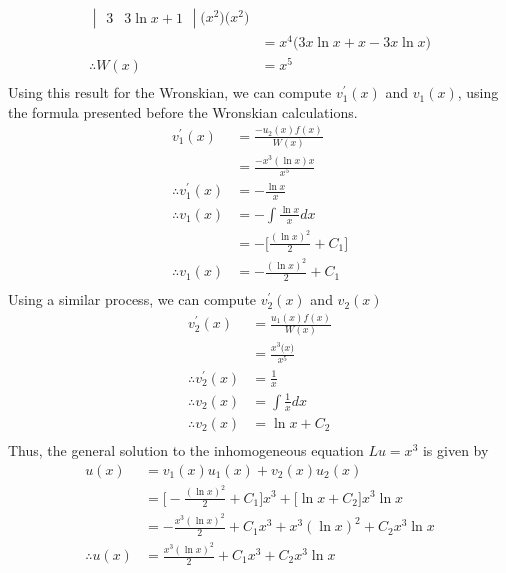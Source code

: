 \documentclass[a4paper]{article}
\newcommand{\ds}{\displaystyle}
\begin{document}
\begin{enumerate}
\begin{align*}
\begin{vmatrix}
			3 & 3\ln x + 1
		\end{vmatrix}\big(x^2\big)\big(x^2\big)\\
		& = x^4 \big(3x\ln x + x - 3x\ln x \big)\\
		\therefore W(x) & = x^5\\
	\end{align*}
	Using this result for the Wronskian, we can compute $\ds{v_1^{\prime}(x)}$ and $\ds{v_1(x)}$, using the formula presented before the Wronskian calculations.
	\begin{align*}
		v_1^{\prime}(x) & = \frac{-u_2(x)f(x)}{W(x)}\\
		& = \frac{-x^3(\ln x)x}{x^5}\\
		\therefore v_1^{\prime}(x) & = -\frac{\ln x}{x}\\
		\therefore v_1(x) & = - \int \frac{\ln x}{x} dx\\
		& = -\bigg[\frac{(\ln x)^2}{2} + C_1 \bigg]\\
		\therefore v_1(x) & = -\frac{(\ln x)^2}{2} + C_1\\
	\end{align*}
	Using a similar process, we can compute $\ds{v_2^{\prime}(x)}$ and $\ds{v_2(x)}$
	\begin{align*}
		v_2^{\prime}(x) & = \frac{u_1(x)f(x)}{W(x)}\\
		& = \frac{x^3\big(x\big)}{x^5}\\
		\therefore v_2^{\prime}(x) & = \frac{1}{x}\\
		\therefore v_2(x) & = \int \frac{1}{x} dx\\
		\therefore v_2(x) & = \ln{x} + C_2\\
	\end{align*}
	Thus, the general solution to the inhomogeneous equation $\ds{Lu = x^3}$ is given by
	\begin{align*}
		u(x) & = v_1(x)u_1(x) + v_2(x)u_2(x)\\
		& = \bigg[-\frac{(\ln x)^2}{2} + C_1\bigg]x^3 + \bigg[\ln{x} + C_2\bigg]x^3\ln x\\
		& = -\frac{x^3(\ln x)^2}{2} + C_1x^3 + x^3(\ln{x})^2 + C_2x^3\ln x\\
		\therefore u(x) & = \frac{x^3(\ln{x})^2}{2} + C_1x^3 + C_2x^3\ln x\\
	\end{align*}

	\bigbreak


\end{enumerate}
\end{document}
